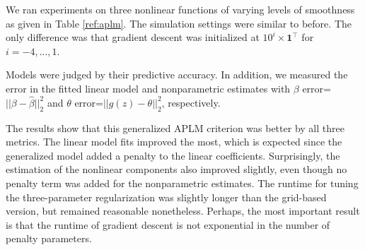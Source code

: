 \documentclass[10pt,letterpaper]{article}
\begin{document}
We ran experiments on three nonlinear functions of varying levels of smoothness as given in Table \ref{ref:aplm}. The simulation settings were similar to before. The only difference was that gradient descent was initialized at $10^i \times \boldsymbol 1^\top$ for $i=-4, ..., 1$.

Models were judged by their predictive accuracy. In addition, we measured the error in the fitted linear model and nonparametric estimates with $\beta$ error=$||\beta - \hat \beta||_2^2$ and $\theta$ error=$|| g(z) - \theta ||_2^2$, respectively.

The results show that this generalized APLM criterion was better by all three metrics. The linear model fits improved the most, which is expected since the generalized model added a penalty to the linear coefficients. Surprisingly, the estimation of the nonlinear components also improved slightly, even though no penalty term was added for the nonparametric estimates. The runtime for tuning the three-parameter regularization was slightly longer than the grid-based version, but remained reasonable nonetheless. Perhaps, the most important result is that the runtime of gradient descent is not exponential in the number of penalty parameters.

\end{document}
